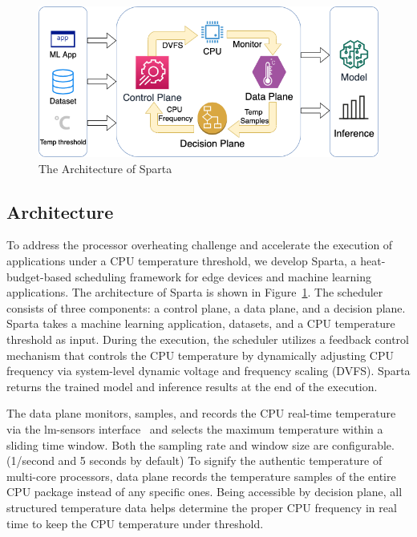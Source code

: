 \begin{figure}[ht]
\includegraphics[width=\textwidth]{figures/Sparta.png}
\caption{The Architecture of Sparta} \label{fig:sparta}
\end{figure}

\subsection{Architecture}

To address the processor overheating challenge and accelerate the execution of applications under a CPU temperature threshold, we develop Sparta, a heat-budget-based scheduling framework for edge devices and machine learning applications. The architecture of Sparta is shown in Figure~\ref{fig:sparta}. The scheduler consists of three components: a control plane, a data plane, and a decision plane. Sparta takes a machine learning application, datasets, and a CPU temperature threshold as input. During the execution, the scheduler utilizes a feedback control mechanism that controls the CPU temperature by dynamically adjusting CPU frequency via system-level dynamic voltage and frequency scaling (DVFS). Sparta returns the trained model and inference results at the end of the execution. 


The data plane monitors, samples, and records the CPU real-time temperature via the lm-sensors interface~\cite{ref:sensors} and selects the maximum temperature within a sliding time window. Both the sampling rate and window size are configurable. (1/second and 5 seconds by default) To signify the authentic temperature of multi-core processors, data plane records the temperature samples of the entire CPU package instead of any specific ones. Being accessible by decision plane, all structured temperature data helps determine the proper CPU frequency in real time to keep the CPU temperature under threshold.

